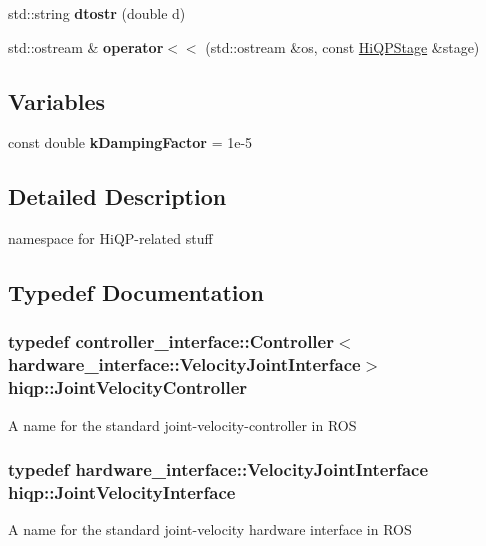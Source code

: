 \begin{DoxyCompactItemize}
\item 
\hypertarget{namespacehiqp_ac9939acdaf35ca4f7c41ea2d0b4f56c1}{std\-::string {\bfseries dtostr} (double d)}\label{namespacehiqp_ac9939acdaf35ca4f7c41ea2d0b4f56c1}

\item 
\hypertarget{namespacehiqp_a24b6e4f1d69ef88dd04cf5479693fca4}{std\-::ostream \& {\bfseries operator$<$$<$} (std\-::ostream \&os, const \hyperlink{structhiqp_1_1HiQPStage}{Hi\-Q\-P\-Stage} \&stage)}\label{namespacehiqp_a24b6e4f1d69ef88dd04cf5479693fca4}

\end{DoxyCompactItemize}
\subsection*{Variables}
\begin{DoxyCompactItemize}
\item 
\hypertarget{namespacehiqp_a0f68bffaa9135d62b92656c4c9e06a0b}{const double {\bfseries k\-Damping\-Factor} = 1e-\/5}\label{namespacehiqp_a0f68bffaa9135d62b92656c4c9e06a0b}

\end{DoxyCompactItemize}


\subsection{Detailed Description}
namespace for Hi\-Q\-P-\/related stuff 

\subsection{Typedef Documentation}
\hypertarget{namespacehiqp_a7b250295f6797153486ce8ab085bd450}{
\subsubsection[{Joint\-Velocity\-Controller}]{\setlength{\rightskip}{0pt plus 5cm}typedef controller\-\_\-interface\-::\-Controller$<$hardware\-\_\-interface\-::\-Velocity\-Joint\-Interface$>$ {\bf hiqp\-::\-Joint\-Velocity\-Controller}}}\label{namespacehiqp_a7b250295f6797153486ce8ab085bd450}
A name for the standard joint-\/velocity-\/controller in R\-O\-S \hypertarget{namespacehiqp_ac536ca3b4ba33489281fa5bec490799c}{
\subsubsection[{Joint\-Velocity\-Interface}]{\setlength{\rightskip}{0pt plus 5cm}typedef hardware\-\_\-interface\-::\-Velocity\-Joint\-Interface {\bf hiqp\-::\-Joint\-Velocity\-Interface}}}\label{namespacehiqp_ac536ca3b4ba33489281fa5bec490799c}
A name for the standard joint-\/velocity hardware interface in R\-O\-S 

